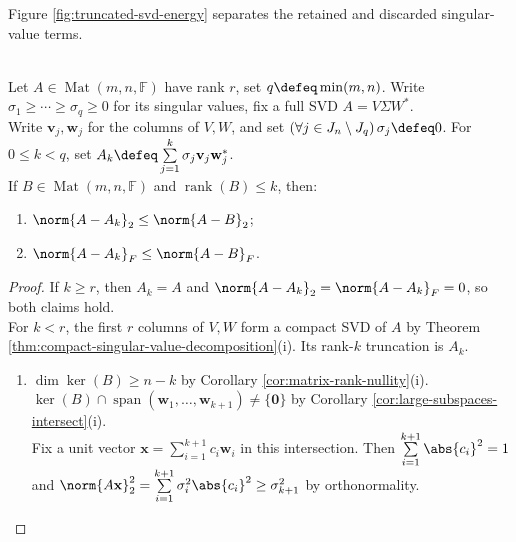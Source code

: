 Figure \ref{fig:truncated-svd-energy} separates the retained and discarded singular-value terms.

\begin{illustrationfigure}[H]
  \centering
  
  \caption{Bars left of the dashed divider form $A_k$; the right-hand bars satisfy $\norm{A-A_k}_F^2=\sum\limits_{j=k+1}^{r}\sigma_j^2$.}
  \label{fig:truncated-svd-energy}
\end{illustrationfigure}

\begin{theorem} \label{thm:eckart-young-frobenius-spectral} \\
Let $A\in\operatorname{Mat}(m,n,\mathbb{F})$ have rank $r$, set $q\defeq\min(m,n)$. Write $\sigma_1\geq\cdots\geq\sigma_q\geq0$ for its singular values, fix a full SVD $A=V\Sigma W^*$.\\
Write $\mathbf{v}_j,\mathbf{w}_j$ for the columns of $V,W$, and set $(\forall j\in J_n\setminus J_q)\,\sigma_j\defeq0$. For $0\leq k<q$, set $A_k\defeq\sum\limits_{j=1}^{k}\sigma_j\mathbf{v}_j\mathbf{w}_j^*$.\\
If $B\in\operatorname{Mat}(m,n,\mathbb{F})$ and $\operatorname{rank}(B)\leq k$, then:
\begin{enumerate}[label=(\roman*)]
\setlength{\itemsep}{0pt}
\item $\norm{A-A_k}_2\leq\norm{A-B}_2$;
\item $\norm{A-A_k}_F\leq\norm{A-B}_F$.
\end{enumerate}
\begin{proof}
If $k\geq r$, then $A_k=A$ and $\norm{A-A_k}_2=\norm{A-A_k}_F=0$, so both claims hold.\\
For $k<r$, the first $r$ columns of $V,W$ form a compact SVD of $A$ by Theorem \ref{thm:compact-singular-value-decomposition}(i). Its rank-$k$ truncation is $A_k$.
\begin{enumerate}[label=(\roman*)]
\setlength{\itemsep}{0pt}
\item $\dim\ker(B)\geq n-k$ by Corollary \ref{cor:matrix-rank-nullity}(i). $\ker(B)\cap\operatorname{span}(\mathbf{w}_1,\ldots,\mathbf{w}_{k+1})\neq\{\mathbf{0}\}$ by Corollary \ref{cor:large-subspaces-intersect}(i).\\
Fix a unit vector $\mathbf{x}=\sum\limits_{i=1}^{k+1}c_i\mathbf{w}_i$ in this intersection. Then $\sum\limits_{i=1}^{k+1}\abs{c_i}^2=1$ and $\norm{A\mathbf{x}}_2^2=\sum\limits_{i=1}^{k+1}\sigma_i^2\abs{c_i}^2\geq\sigma_{k+1}^2$ by orthonormality.\\

\end{enumerate}
\end{proof}
\end{theorem}
